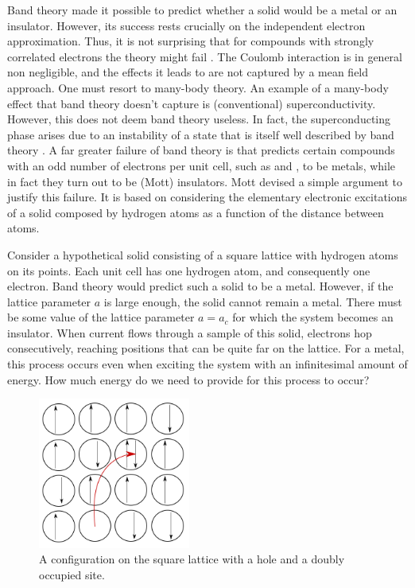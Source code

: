 Band theory made it possible to predict whether a solid would be a metal or an insulator. However, its success rests crucially on the independent electron approximation. Thus, it is not surprising that for compounds with strongly correlated electrons the theory might fail \cite{Mila2007}. The Coulomb interaction is in general non negligible, and the effects it leads to are not captured by a mean field approach. One must resort to many-body theory. An example of a many-body effect that band theory doesn't capture is (conventional) superconductivity. However, this does not deem band theory useless. In fact, the superconducting phase arises due to an instability of a state that is itself well described by band theory \cite{deGennes1999}. A far greater failure of band theory is that predicts certain compounds with an odd number of electrons per unit cell, such as  and ,  to be metals, while in fact  they turn out to be (Mott) insulators. Mott devised a simple argument to justify this failure. It is based on considering the elementary electronic excitations of a solid composed by hydrogen atoms as a function of the distance between atoms.

Consider a hypothetical solid consisting of a square lattice with hydrogen atoms on its points. Each unit cell has one hydrogen atom, and consequently one electron. Band theory would predict such a solid to be a metal. However, if the lattice parameter $a$ is large enough, the solid cannot remain a metal. There must be some value of the lattice parameter $a = a_c$ for which the system becomes an insulator. When current flows through a sample of this solid, electrons hop consecutively, reaching positions that can be quite far on the lattice. For a metal, this process occurs even when exciting the system with an infinitesimal amount of energy. How much energy do we need to provide for this process to occur?

\begin{figure}[ht!]\label{hubbardOneHoleOneDoublyOc}
\centering
\includegraphics[width = 5cm]{Figures/HubbardModel/hubbardOneHoleOneDoublyOc.png}
\caption{A configuration on the square lattice with a hole and a doubly occupied site.}
\end{figure}

